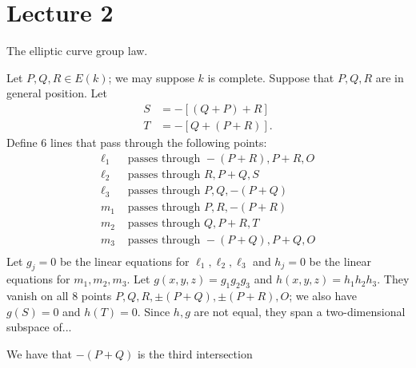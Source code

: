 \section{Lecture 2}
The elliptic curve group law.

Let $P,Q,R\in E(k)$; we may suppose $k$ is complete. Suppose that $P,Q,R$ are in general position. Let
\begin{align*}
S&=-[(Q+P)+R]\\
T&=-[Q+(P+R)].
\end{align*}
Define 6 lines that pass through the following points:
\begin{align*}
\ell_1 &\text{ passes through } -(P+R), P+R, O\\
\ell_2 &\text{ passes through } R, P+Q, S\\
\ell_3 &\text{ passes through } P, Q, -(P+Q)\\
m_1 &\text{ passes through } P, R, -(P+R)\\
m_2 &\text{ passes through } Q, P+R, T\\
m_3 &\text{ passes through } -(P+Q), P+Q, O\\
\end{align*}
Let $g_j=0$ be the linear equations for $\ell_1,\ell_2,\ell_3$ and $h_j=0$ be the linear equations for $m_1,m_2,m_3$. Let $g(x,y,z)=g_1g_2g_3$ and $h(x,y,z)=h_1h_2h_3$. They vanish on all 8 points $P, Q, R, \pm(P+Q), \pm(P+R), O$; we also have $g(S)=0$ and $h(T)=0$. Since $h,g$ are not equal, they span a two-dimensional subspace of...

We have that $-(P+Q)$ is the third intersection

